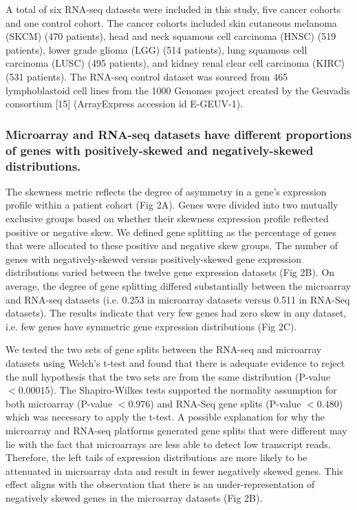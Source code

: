 \documentclass[11pt]{article}
\begin{document}
A total of six RNA-seq datasets were included in this study, five cancer cohorts and one control cohort. The cancer cohorts included skin cutaneous melanoma (SKCM) (470 patients), head and neck squamous cell carcinoma (HNSC) (519 patients), lower grade glioma (LGG) (514 patients), lung squamous cell carcinoma (LUSC) (495 patients), and kidney renal clear cell carcinoma (KIRC) (531 patients). The RNA-seq control dataset was sourced from 465 lymphoblastoid cell lines from the 1000 Genomes project created by the Geuvadis consortium [15] (ArrayExpress accession id E-GEUV-1). 

\subsubsection*{Microarray and RNA-seq datasets have different proportions of genes with positively-skewed and negatively-skewed distributions.}

The skewness metric reflects the degree of asymmetry in a gene’s expression profile within a patient cohort (Fig 2A). Genes were divided into two mutually exclusive groups based on whether their skewness expression profile reflected positive or negative skew. We defined gene splitting as the percentage of genes that were allocated to these positive and negative skew groups. The number of genes with negatively-skewed versus positively-skewed gene expression distributions varied between the twelve gene expression datasets (Fig 2B). On average, the degree of gene splitting differed substantially between the microarray and RNA-seq datasets (i.e. 0.253 in microarray datasets versus 0.511 in RNA-Seq datasets). The results indicate that very few genes had zero skew in any dataset, i.e. few genes have symmetric gene expression distributions (Fig 2C).
\newline

We tested the two sets of gene splits between the RNA-seq and microarray datasets using Welch’s t-test and found that there is adequate evidence to reject the null hypothesis that the two sets are from the same distribution (P-value $< 0.00015$). The Shapiro-Wilkes tests supported the normality assumption for both microarray (P-value $< 0.976$) and RNA-Seq gene splits (P-value $< 0.480$) which was necessary to apply the t-test. A possible explanation for why the microarray and RNA-seq platforms generated gene splits that were different may lie with the fact that microarrays are less able to detect low transcript reads. Therefore, the left tails of expression distributions are more likely to be attenuated in microarray data and result in fewer negatively skewed genes. This effect aligns with the observation that there is an under-representation of negatively skewed genes in the microarray datasets (Fig 2B).
\newline
\end{document}
